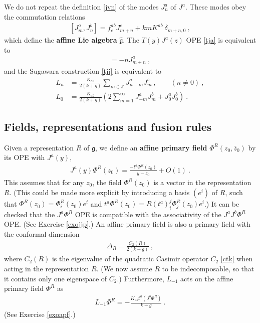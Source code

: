 \documentclass[12pt,a4paper,notitlepage]{report}
\numberwithin{equation}{section}
\theoremstyle{break}
\begin{document}
We do not repeat the definition \eqref{jvn} of the modes $J^a_n$ of $J^a$.
These modes obey the commutation relations
\begin{align}
 \boxed{[J^a_m,J^b_n] =   f^{ab}_c J^c_{m+n} +kmK^{ab}\ \delta_{m+n,0}} \ , 
\label{jam}
\end{align}
which define the \textbf{\boldmath affine Lie algebra} $\hat{\mathfrak{g}}$. 
The $T(y)J^a(z)$ OPE \eqref{tja} is equivalent to
\begin{align}
 [L_m,J^a_n] = -nJ^a_{m+n}\ ,
\end{align}
and the Sugawara construction \eqref{tjj} is equivalent to 
\begin{align}
 L_n &= \frac{K_{ab}}{2(k+g)} \sum_{m\in{\mathbb{Z}}} J^a_{n-m}J^b_m\ , \qquad (n\neq 0)\ ,
\label{ljj}
\\
L_0 & = \frac{K_{ab}}{2(k+g)}\left(2\sum_{m=1}^\infty J^a_{-m}J^b_m + J^a_0J^b_0\right)\ .
\label{lzjj}
\end{align}

\subsection{Fields, representations and fusion rules}
 
Given a representation $R$ of $\mathfrak{g}$, we define an \textbf{\boldmath affine primary field} $\Phi^{R}(z_0,\bar{z}_0)$ by its OPE with $J^a(y)$,
\begin{align}
 \boxed{ J^a(y) \Phi^{R}(z_0) = \frac{-t^a\Phi^{R}(z_0)}{y-z_0} + O(1) } \ .
\label{jpr}
\end{align}
This assumes that for any $z_0$, the field $\Phi^{R}(z_0)$ is a vector in the representation $R$. (This could be made more explicit by introducing  a basis $(e^i)$ of $R$, such that $\Phi^{R}(z_0) = \Phi^{R}_i(z_0)e^i$ and $t^a \Phi^{R}(z_0) = R(t^a)_i^j \Phi^{R}_j(z_0)e^i$.) 
It can be checked that the $J^a\Phi^R$ OPE is compatible with the associativity of the $J^aJ^b\Phi^R$ OPE. (See Exercise \ref{exojjp}.)
An affine primary field is also a primary field with the conformal dimension 
\begin{align}
 \boxed{\Delta_R  = \frac{C_2(R)}{2(k+g)}}\ ,
\label{dr}
\end{align}
where $C_2(R)$ is the eigenvalue of the quadratic Casimir operator $C_2$ \eqref{ctk} when acting in the representation $R$. (We now assume $R$ to be indecomposable, so that it contains only one eigenspace of $C_2$.) Furthermore, $L_{-1}$ acts on the affine primary field $\Phi^R$ as 
\begin{align}
L_{-1}\Phi^R = -\frac{K_{ab}t^a(J^b\Phi^R)}{k+g} \ .
\label{lmp}
\end{align}
(See Exercise \ref{exoapf}.)
\end{document}

